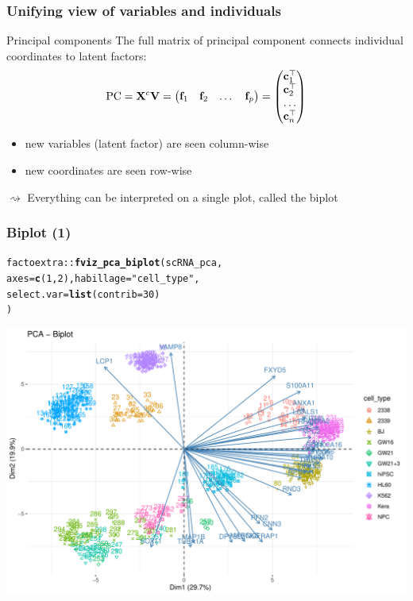 \documentclass{beamer}\usepackage[]{graphicx}\usepackage[]{color}
\makeatletter
\newcommand{\hlnum}[1]{\textcolor[rgb]{0.686,0.059,0.569}{#1}}%
\newcommand{\hlstr}[1]{\textcolor[rgb]{0.192,0.494,0.8}{#1}}%
\newcommand{\hlopt}[1]{\textcolor[rgb]{0,0,0}{#1}}%
\newcommand{\hlstd}[1]{\textcolor[rgb]{0.345,0.345,0.345}{#1}}%
\newcommand{\hlkwc}[1]{\textcolor[rgb]{0.333,0.667,0.333}{#1}}%
\newcommand{\hlkwd}[1]{\textcolor[rgb]{0.737,0.353,0.396}{\textbf{#1}}}%
\newenvironment{kframe}{%
 \def\at@end@of@kframe{}%
 \ifinner\ifhmode%
  \def\at@end@of@kframe{\end{minipage}}%
  \begin{minipage}{\columnwidth}%
 \fi\fi%
 \def\FrameCommand##1{\hskip\@totalleftmargin \hskip-\fboxsep
 \colorbox{shadecolor}{##1}\hskip-\fboxsep
     \hskip-\linewidth \hskip-\@totalleftmargin \hskip\columnwidth}%
 \MakeFramed {\advance\hsize-\width
   \@totalleftmargin\z@ \linewidth\hsize
   \@setminipage}}%
 {\par\unskip\endMakeFramed%
 \at@end@of@kframe}
\newenvironment{knitrout}{}{} %
\makeatother
\begin{document}
\begin{frame}[fragile]
  \frametitle{Unifying view of variables and individuals}

  \begin{block}{Principal components}
   The full matrix of principal component connects  individual coordinates to latent factors:
    \begin{equation*}
      \mathrm{PC} = \mathbf{X}^c \mathbf{V} = \begin{pmatrix}
      \mathbf{f}_{1} & \mathbf{f}_{2} & \dots & \mathbf{f}_{p}
      \end{pmatrix}
      = \begin{pmatrix} 
      \mathbf{c}_{1}^\top \\ \mathbf{c}_{2}^\top \\\dots \\ \mathbf{c}_{n}^\top 
      \end{pmatrix}
    \end{equation*}
  \end{block}

  \vfill
  
  \begin{itemize}
    \item new variables (latent factor) are seen column-wise
    \item new coordinates are seen row-wise
  \end{itemize}

  $\rightsquigarrow$ Everything can be interpreted on a single plot, called the biplot

\end{frame}

\begin{frame}[fragile]
  \frametitle{Biplot (1)}
\begin{knitrout}\scriptsize
{}\color{fgcolor}\begin{kframe}
\begin{alltt}
  \hlstd{factoextra}\hlopt{::}\hlkwd{fviz_pca_biplot}\hlstd{(scRNA_pca,}
    \hlkwc{axes} \hlstd{=} \hlkwd{c}\hlstd{(}\hlnum{1}\hlstd{,}\hlnum{2}\hlstd{),} \hlkwc{habillage} \hlstd{=} \hlstr{"cell_type"}\hlstd{,}
    \hlkwc{select.var} \hlstd{=} \hlkwd{list}\hlstd{(}\hlkwc{contrib} \hlstd{=} \hlnum{30}\hlstd{)}
  \hlstd{)}
\end{alltt}
\end{kframe}
\includegraphics[width=.8\textwidth]{figures/biplot1_scRNA_untransformed-1} 
\end{knitrout}
\end{frame}
\end{document}
